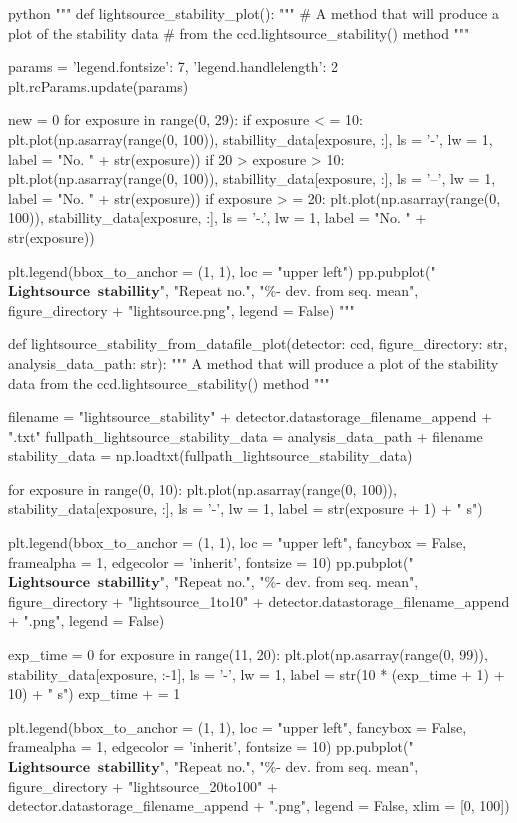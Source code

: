 \documentclass[../main.tex]{subfiles}
\begin{document}
\begin{mintedbox}{python}
"""
def lightsource_stability_plot():
"""
# A method that will produce a plot of the stability data
# from the ccd.lightsource_stability() method
"""

params  =  {'legend.fontsize': 7, 'legend.handlelength': 2}
plt.rcParams.update(params)

new  =  0
for exposure in range(0, 29):
if exposure < =  10:
plt.plot(np.asarray(range(0, 100)), stabillity_data[exposure, :], ls = '-', lw = 1, label = "No. " + str(exposure))
if 20 > exposure > 10:
plt.plot(np.asarray(range(0, 100)), stabillity_data[exposure, :], ls = '--', lw = 1, label = "No. " + str(exposure))
if exposure > =  20:
plt.plot(np.asarray(range(0, 100)), stabillity_data[exposure, :], ls = '-.', lw = 1, label = "No. " + str(exposure))

plt.legend(bbox_to_anchor = (1, 1), loc = "upper left")
pp.pubplot("$\mathbf{Lightsource\;\;stabillity}$", "Repeat no.", "\%- dev. from seq. mean", figure_directory + "lightsource.png", legend = False)
"""


def lightsource_stability_from_datafile_plot(detector: ccd, figure_directory: str, analysis_data_path: str):
"""
A method that will produce a plot of the stability data
from the ccd.lightsource_stability() method
"""

filename  =  "lightsource_stability" + detector.datastorage_filename_append + ".txt"
fullpath_lightsource_stability_data  =  analysis_data_path + filename
stability_data  =  np.loadtxt(fullpath_lightsource_stability_data)

for exposure in range(0, 10):
plt.plot(np.asarray(range(0, 100)), stability_data[exposure, :], ls  =  '-', lw  =  1,
label  =  str(exposure + 1) + " s")

plt.legend(bbox_to_anchor  =  (1, 1), loc  =  "upper left", fancybox  =  False, framealpha  =  1, edgecolor  =  'inherit',
fontsize  =  10)
pp.pubplot("$\mathbf{Lightsource\;\;stabillity}$", "Repeat no.", "\%- dev. from seq. mean",
figure_directory + "lightsource_1to10" + detector.datastorage_filename_append + ".png", legend  =  False)

exp_time  =  0
for exposure in range(11, 20):
plt.plot(np.asarray(range(0, 99)), stability_data[exposure, :-1], ls  =  '-', lw  =  1,
label  =  str(10 * (exp_time + 1) + 10) + " s")
exp_time + =  1

plt.legend(bbox_to_anchor  =  (1, 1), loc  =  "upper left", fancybox  =  False, framealpha  =  1, edgecolor  =  'inherit',
fontsize  =  10)
pp.pubplot("$\mathbf{Lightsource\;\;stabillity}$", "Repeat no.", "\%- dev. from seq. mean",
figure_directory + "lightsource_20to100" + detector.datastorage_filename_append + ".png", legend  =  False,
xlim  =  [0, 100])


\end{mintedbox}
\end{document}
